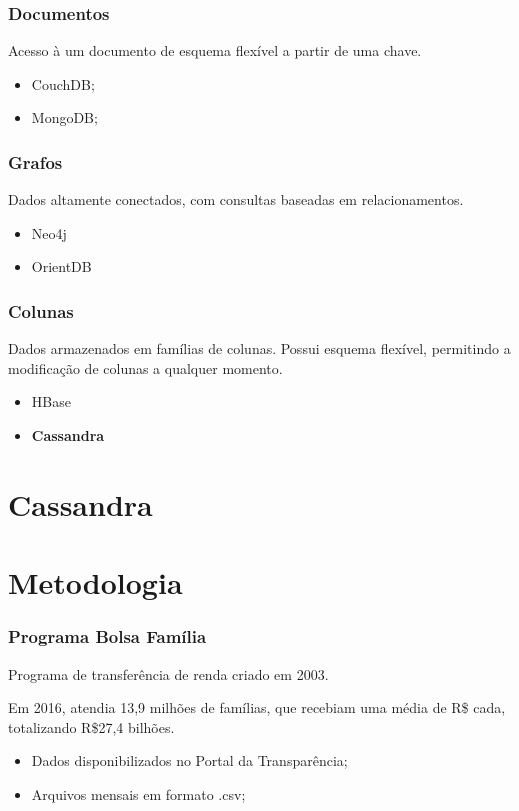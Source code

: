 \documentclass[brazil]{beamer}
\begin{document}
\begin{frame}
	\frametitle{Documentos}
		Acesso à um documento de esquema flexível a partir de uma chave.
		\begin{itemize}
			\item CouchDB;
			\item MongoDB;
		\end{itemize}
\end{frame}

\begin{frame}
	\frametitle{Grafos}
		Dados altamente conectados, com consultas baseadas em relacionamentos.
		\begin{itemize}
			\item Neo4j
			\item OrientDB
		\end{itemize}
\end{frame}

\begin{frame}
	\frametitle{Colunas}
		Dados armazenados em famílias de colunas. Possui esquema flexível, permitindo a modificação de colunas a qualquer momento.
		\begin{itemize}
			\item HBase
			\item \textbf{Cassandra}
		\end{itemize}
\end{frame}

\section{Cassandra}


\section{Metodologia}
\begin{frame}
	\frametitle{Programa Bolsa Família}
	Programa de transferência de renda criado em 2003. 
	
	Em 2016, atendia 13,9 milhões de famílias, que recebiam uma média de R\$ cada, totalizando R\$27,4 bilhões.
	
	\begin{itemize}
		\item Dados disponibilizados no Portal da Transparência;
		\item Arquivos mensais em formato .csv;
	\end{itemize}
\end{frame}
\end{document}
